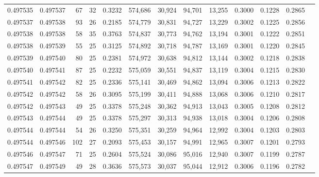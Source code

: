 \begin{tabular}{rrrrrrrrrrrrr}
0.497535 & 0.497537 &  67 &  32 &                                     0.3232 & 574,686 &  30,924 &  94,701 &  13,255 & 0.3000 & 0.1228 & 0.2865 \\
0.497537 & 0.497538 &  93 &  26 &                                     0.2185 & 574,779 &  30,831 &  94,727 &  13,229 & 0.3002 & 0.1225 & 0.2856 \\
0.497538 & 0.497538 &  58 &  35 &                                     0.3763 & 574,837 &  30,773 &  94,762 &  13,194 & 0.3001 & 0.1222 & 0.2851 \\
0.497538 & 0.497539 &  55 &  25 &                                     0.3125 & 574,892 &  30,718 &  94,787 &  13,169 & 0.3001 & 0.1220 & 0.2845 \\
0.497539 & 0.497540 &  80 &  25 &                                     0.2381 & 574,972 &  30,638 &  94,812 &  13,144 & 0.3002 & 0.1218 & 0.2838 \\
0.497540 & 0.497541 &  87 &  25 &                                     0.2232 & 575,059 &  30,551 &  94,837 &  13,119 & 0.3004 & 0.1215 & 0.2830 \\
0.497541 & 0.497542 &  82 &  25 &                                     0.2336 & 575,141 &  30,469 &  94,862 &  13,094 & 0.3006 & 0.1213 & 0.2822 \\
0.497542 & 0.497542 &  58 &  26 &                                     0.3095 & 575,199 &  30,411 &  94,888 &  13,068 & 0.3006 & 0.1210 & 0.2817 \\
0.497542 & 0.497543 &  49 &  25 &                                     0.3378 & 575,248 &  30,362 &  94,913 &  13,043 & 0.3005 & 0.1208 & 0.2812 \\
0.497543 & 0.497544 &  49 &  25 &                                     0.3378 & 575,297 &  30,313 &  94,938 &  13,018 & 0.3004 & 0.1206 & 0.2808 \\
0.497544 & 0.497544 &  54 &  26 &                                     0.3250 & 575,351 &  30,259 &  94,964 &  12,992 & 0.3004 & 0.1203 & 0.2803 \\
0.497544 & 0.497546 & 102 &  27 &                                     0.2093 & 575,453 &  30,157 &  94,991 &  12,965 & 0.3007 & 0.1201 & 0.2793 \\
0.497546 & 0.497547 &  71 &  25 &                                     0.2604 & 575,524 &  30,086 &  95,016 &  12,940 & 0.3007 & 0.1199 & 0.2787 \\
0.497547 & 0.497549 &  49 &  28 &                                     0.3636 & 575,573 &  30,037 &  95,044 &  12,912 & 0.3006 & 0.1196 & 0.2782 \\

\end{tabular}
